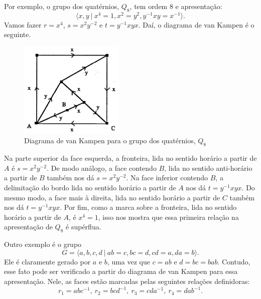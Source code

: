 	\par\vspace{0.3cm} Por exemplo, o grupo dos quatérnios, $Q_8$, tem ordem $8$ e apresentação:
	\begin{equation*}
		\langle x,y \ | \ x^4=1, x^2=y^2, y^{-1}xy = x^{-1} \rangle.
	\end{equation*}
	Vamos fazer $r = x^4$, $s = x^2y^{-2}$ e $t = y^{-1}xyx$. Daí, o diagrama de van Kampen é o seguinte.
	\begin{figure}[H]
		\begin{center}
			\includegraphics[width=5cm]{Images/diagrama_quaternios.png}
		\end{center}
	\caption{Diagrama de van Kampen para o grupo dos quatérnios, $Q_8$}
	\label{figura diagrama quaternios}
	\end{figure}
	Na parte superior da face esquerda, a fronteira, lida no sentido horário a partir de $A$ é 
	$s = x^2y^{-2}$. De modo análogo, a face contendo $B$, lida no sentido anti-horário a partir 
	de $B$ também nos dá $s = x^2y^{-2}$. Na face inferior contendo $B$, a delimitação do bordo 
	lida no sentido horário a partir de $A$ nos dá $t = y^{-1}xyx$. Do mesmo modo, a face mais à direita, 
	lida no sentido horário a partir de $C$ também nos dá $t = y^{-1}xyx$. Por fim, como a marca sobre a
	fronteira, lida no sentido horário a partir de $A$, é $x^4=1$, isso nos mostra que essa primeira 
	relação na apresentação de $Q_8$ é supérflua.
	\par\vspace{0.3cm} Outro exemplo é o grupo 
	\begin{equation*}
	    G = \langle a,b,c,d \ | \ ab = c, bc = d, cd = a, da = b \rangle.
	\end{equation*}
	Ele é claramente gerado por $a$ e $b$, uma vez que $c = ab$ e $d = bc = bab$. Contudo, 
	esse fato pode ser verificado a partir do diagrama de van Kampen para essa apresentação. 
	Nele, as faces estão marcadas pelas seguintes relações definidoras:
	\begin{equation*}
	    r_1 = abc^{-1}, \ r_2 = bcd^{-1}, \ r_3 = cda^{-1}, \ r_4 = dab^{-1}.
	\end{equation*}

